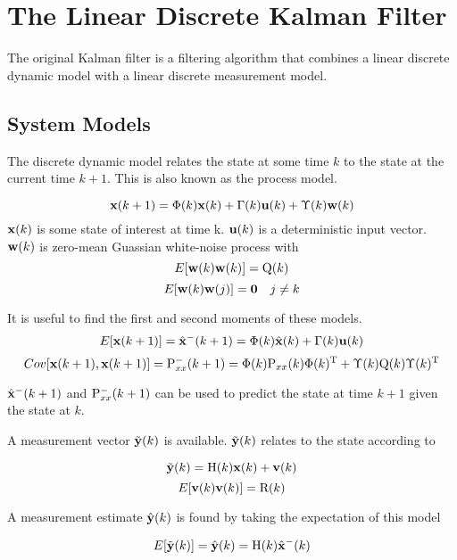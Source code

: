 \section{The Linear Discrete Kalman Filter}

The original Kalman filter is a filtering algorithm that combines a linear discrete dynamic model with a linear discrete measurement model.

\subsection{System Models}
The discrete dynamic model relates the state at some time $ k $ to the state at the current time $ k+1 $.
This is also known as the process model.

\begin{equation}
\mathrm{\mathbf{x}}(k+1)=\Phi(k)\mathrm{\mathbf{x}}(k)+\Gamma(k)\mathrm{\mathbf{u}}(k) + \Upsilon(k)\mathrm{\mathbf{w}}(k)
\end{equation}
$\mathrm{\mathbf{x}}(k)$ is some state of interest at time k.
$\mathrm{\mathbf{u}}(k)$ is a deterministic input vector.
$\mathrm{\mathbf{w}}(k) $ is zero-mean Guassian white-noise process with 
\begin{equation}
E[\mathrm{\mathbf{w}}(k)\mathrm{\mathbf{w}}(k)]=\mathrm{Q}(k) 
\end{equation}
\begin{equation}
E[\mathrm{\mathbf{w}}(k)\mathrm{\mathbf{w}}(j)]=\mathbf{0}  \quad j \neq k
\end{equation}

It is useful to find the first and second moments of these models.
\begin{equation}
E[\mathrm{\mathbf{x}}(k+1)]=\hat{\mathrm{\mathbf{x}}}^-(k+1)  =\Phi(k)\hat{\mathrm{\mathbf{x}}}(k)+\Gamma(k)\mathrm{\mathbf{u}}(k)
\end{equation}
\begin{equation}
Cov[\mathrm{\mathbf{x}}(k+1),\mathrm{\mathbf{x}}(k+1)]=\mathrm{P}_{xx}^-(k+1) =\Phi(k)\mathrm{P}_{xx}(k)\Phi(k)^{\mathrm{T}} +\Upsilon(k)\mathrm{Q}(k)\Upsilon(k)^{\mathrm{T}} 
\end{equation}

$ \hat{\mathrm{\mathbf{x}}}^-(k+1) $ and $ \mathrm{P}_{xx}^-(k+1) $ can be used to predict the state at time $ k+1 $ given the state at $ k$.

A measurement vector $ \tilde{\mathrm{\mathbf{y}}}(k) $ is available.
$ \tilde{\mathrm{\mathbf{y}}}(k) $ relates to the state according to 

\begin{equation}
\tilde{\mathrm{\mathbf{y}}}(k)=\mathrm{H}(k)\mathrm{\mathbf{x}}(k)+\mathrm{\mathbf{v}}(k)
\end{equation}
\begin{equation}
E[\mathrm{\mathbf{v}}(k)\mathrm{\mathbf{v}}(k)]=\mathrm{R}(k) 
\end{equation}

A measurement estimate $ \hat{\mathrm{\mathbf{y}}}(k) $ is found by taking the expectation of this model

\begin{equation}
E[\tilde{\mathrm{\mathbf{y}}}(k)]=\hat{\mathrm{\mathbf{y}}}(k)=\mathrm{H}(k)\hat{\mathrm{\mathbf{x}}}^-(k)
\end{equation}

